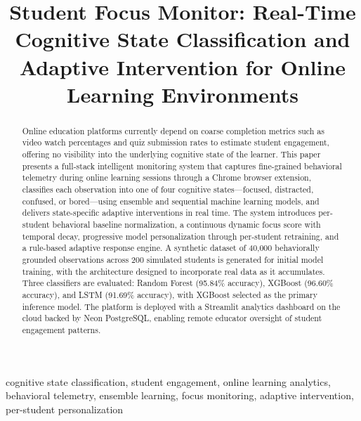 \documentclass[conference]{IEEEtran}
\begin{document}
\title{Student Focus Monitor: Real-Time Cognitive State Classification and Adaptive Intervention for Online Learning Environments}

\author{
}

\maketitle

\begin{abstract}
Online education platforms currently depend on coarse completion metrics such as video watch percentages and quiz submission rates to estimate student engagement, offering no visibility into the underlying cognitive state of the learner. This paper presents a full-stack intelligent monitoring system that captures fine-grained behavioral telemetry during online learning sessions through a Chrome browser extension, classifies each observation into one of four cognitive states---focused, distracted, confused, or bored---using ensemble and sequential machine learning models, and delivers state-specific adaptive interventions in real time. The system introduces per-student behavioral baseline normalization, a continuous dynamic focus score with temporal decay, progressive model personalization through per-student retraining, and a rule-based adaptive response engine. A synthetic dataset of 40,000 behaviorally grounded observations across 200 simulated students is generated for initial model training, with the architecture designed to incorporate real data as it accumulates. Three classifiers are evaluated: Random Forest (95.84\% accuracy), XGBoost (96.60\% accuracy), and LSTM (91.69\% accuracy), with XGBoost selected as the primary inference model. The platform is deployed with a Streamlit analytics dashboard on the cloud backed by Neon PostgreSQL, enabling remote educator oversight of student engagement patterns.
\end{abstract}

\begin{IEEEkeywords}
cognitive state classification, student engagement, online learning analytics, behavioral telemetry, ensemble learning, focus monitoring, adaptive intervention, per-student personalization
\end{IEEEkeywords}
\end{document}
